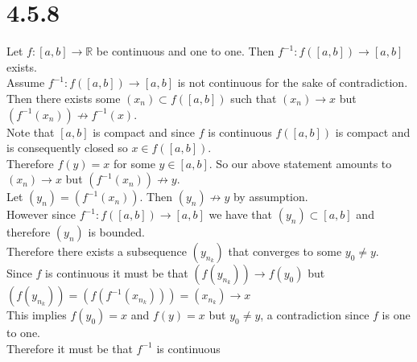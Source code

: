 \documentclass{article}
\begin{document}
\section*{4.5.8}
\begin{center}
    \doublespacing
    Let $f:[a, b]\rightarrow\mathbb{R}$ be continuous and one to one. Then $f^{-1}: f([a, b])\rightarrow [a, b]$ exists.
    \\Assume $f^{-1}: f([a, b])\rightarrow [a, b]$ is not continuous for the sake of contradiction.
    \\Then there exists some $(x_n)\subset f([a, b])$ such that $(x_n)\rightarrow x$ but $(f^{-1} (x_n))\not\rightarrow f^{-1}(x)$.
    \\Note that $[a, b]$ is compact and since $f$ is continuous $f([a, b])$ is compact and is consequently closed so $x\in f([a, b])$.
    \\Therefore $f(y) = x$ for some $y\in [a, b]$. So our above statement amounts to $(x_n)\rightarrow x$ but $(f^{-1} (x_n))\not\rightarrow y$.
    \\Let $(y_n) = (f^{-1} (x_n))$. Then $(y_n)\not\rightarrow y$ by assumption.
    \\However since $f^{-1}: f([a, b])\rightarrow [a, b]$ we have that $(y_n)\subset [a, b]$ and therefore $(y_n)$ is bounded.
    \\Therefore there exists a subsequence $(y_{n_k})$ that converges to some $y_0\neq y$.
    \\Since $f$ is continuous it must be that $(f(y_{n_k}))\rightarrow f(y_0)$ but $(f(y_{n_k})) = (f(f^{-1} (x_{n_k}))) = (x_{n_k})\rightarrow x$
    \\This implies $f(y_0) = x$ and $f(y) = x$ but $y_0\neq y$, a contradiction since $f$ is one to one.
    \\Therefore it must be that $f^{-1}$ is continuous \qedsymbol
\end{center}
\end{document}
